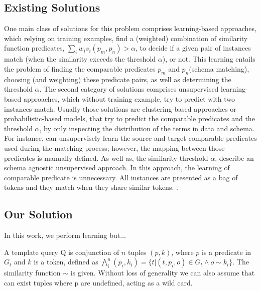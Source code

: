 \subsection{Existing Solutions} One main class of solutions for this problem comprises learning-based approaches, which relying on training examples, find a (weighted) combination of similarity function predicates, $\sum_i{w_i s_i(p_m,p_n)} > \alpha$, to decide if a given pair of instances match (when the similarity exceeds the threshold $\alpha$), or not. This learning entails the problem of finding the comparable predicates $p_m$ and $p_n$(schema matching), choosing (and weighting) these predicate pairs, as well as determining the threshold $\alpha$.  The second category of solutions comprises unsupervised learning-based approaches, which without training example, try to  predict with two instances match. Usually those solutions are clustering-based approaches or probabilistic-based models, that try to predict the comparable predicates and the threshold $\alpha$, by only inspecting the distribution of the terms in data and schema.  For instance,  \cite{DBLP:conf/semweb/SongH11} can unsupervisely learn the source and target comparable predicates used during the matching process; however, the mapping between those predicates is manually defined. As well as, the similarity threshold $\alpha$. \cite{DBLP:conf/wsdm/PapadakisINF11} describe an schema agnostic unsupervised approach. In this approach, the learning of comparable predicate is unnecessary. All instances are presented as a bag of tokens and they match when they share similar tokens. 
.


\subsection{Our Solution}
In this work, we perform learning but...

\begin{definition}   A template query Q is conjunction of $n$ tuples $(p, k)$, where $p$ is a predicate in $G_t$ and $k$ is a token, defined as $ \bigwedge_{i}^n (p_i, k_i)=\{t | (t,p_i,o) \in G_t  \land o \sim k_i  \}$. The similarity function $\sim$ is given. Without loss of generality we can also assume that can exist tuples where p are undefined, acting as a wild card. 
\end{definition} 
 
